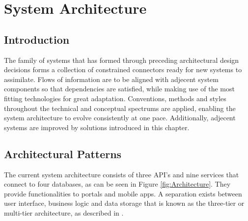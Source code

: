 \graphicspath{{Chapter3/Figs/Vector/}{Chapter3/Figs/}}

%
\chapter{System Architecture}
\section{Introduction}
The family of systems that has formed through preceding architectural design decisions forms a collection of constrained connectors ready for new systems to assimilate. Flows of information are to be aligned with adjecent system components so that dependencies are satisfied, while making use of the most fitting technologies for great adaptation. Conventions, methods and styles throughout the technical and conceptual spectrums are applied, enabling the system architecture to evolve consistently at one pace. Additionally, adjecent systems are improved by solutions introduced in this chapter.

%
\section{Architectural Patterns}
The current system architecture consists of three API's and nine services that connect to four databases, as can be seen in Figure \ref{fig:Architecture}. They provide functionalities to portals and mobile apps. A separation exists between user interface, business logic and data storage that is known as the three-tier or multi-tier architecture, as described in \cite{IBM-3-tier}.

